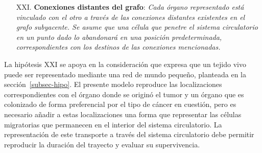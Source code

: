 \begin{itemize}
\item [XXI.] \textbf{Conexiones distantes del grafo}: \emph{Cada \'organo representado est\'a vinculado con el otro a trav\'es de las conexiones distantes existentes en el grafo subyacente. Se asume que una c\'elula que penetre el sistema circulatorio en un punto dado lo abandonar\'a en una posici\'on predeterminada, correspondientes con los destinos de las conexiones mencionadas.} \label{XXI}
\end{itemize}

La hip\'otesis XXI se apoya en la consideraci\'on que expresa que un tejido vivo puede ser representado mediante una red de mundo peque\~no, planteada en la secci\'on~\ref{subsec-hipo}. El presente modelo reproduce las localizaciones correspondientes con el \'organo donde se origin\'o el tumor y un \'organo que es colonizado de forma preferencial por el tipo de c\'ancer en cuesti\'on, pero es necesario a\~nadir a estas localizaciones una forma que representar las c\'elulas migratorias que permanecen en el interior del sistema circulatorio. La representaci\'on de este transporte a trav\'es del sistema circulatorio debe permitir reproducir la duraci\'on del trayecto y evaluar su supervivencia. 

